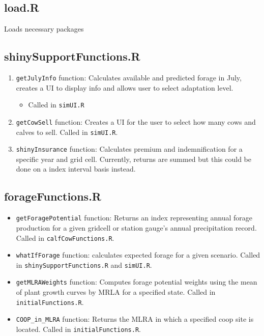 \documentclass[11pt]{article}
\begin{document}
\subsection{load.R}
Loads necessary packages

\subsection{shinySupportFunctions.R}
\begin{enumerate}
\item \verb!getJulyInfo! function: Calculates available and predicted forage in July, creates a
    UI to display info and allows user to select adaptation level.
    \begin{itemize}
    \item Called in \verb!simUI.R!
    \end{itemize}
\item \verb!getCowSell! function: Creates a UI for the user to select how many cows and calves to sell. Called in \verb!simUI.R!.
\item \verb!shinyInsurance! function: Calculates premium and indemnification for a specific year and grid cell. Currently, returns are summed but this could be done on a index interval basis instead.
\end{enumerate}

\subsection{forageFunctions.R}

\begin{itemize}
	\item \verb!getForagePotential! function: Returns an index representing
  annual forage production for a given gridcell or station gauge's annual precipitation record. Called in \verb!calfCowFunctions.R!.
	\item \verb!whatIfForage! function: calculates expected forage for a given scenario. Called in \verb!shinySupportFunctions.R! and \verb!simUI.R!.
	\item \verb!getMLRAWeights! function: Computes forage potential weights using the
  mean of plant growth curves by MRLA for a specified state. Called in \verb!initialFunctions.R!.
  	\item \verb!COOP_in_MLRA! function: Returns the MLRA in which a specified
  coop site is located. Called in \verb!initialFunctions.R!.
\end{itemize}
\end{document}

